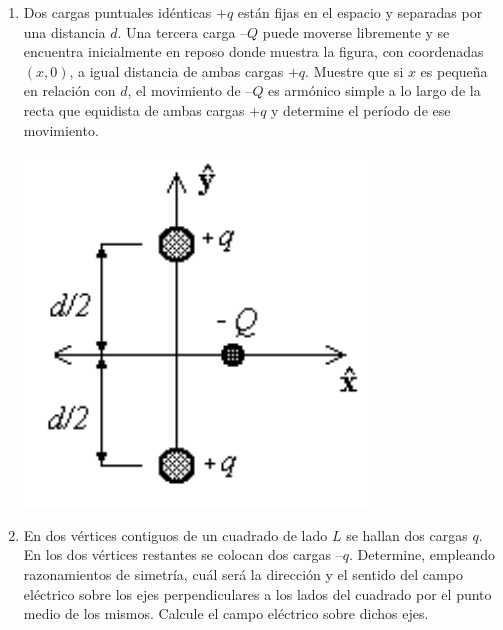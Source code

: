 \documentclass[11pt,spanish,a4paper]{article}
\begin{document}
\begin{enumerate}
	\item \begin{minipage}[t][4.5cm]{0.7\textwidth}
		Dos cargas puntuales idénticas \(+q\) están fijas en el espacio y separadas por una distancia \(d\).
		Una tercera carga \(–Q\) puede moverse libremente y se encuentra inicialmente en reposo donde muestra la figura, con coordenadas \((x,0)\), a igual distancia de ambas cargas \(+q\).
		Muestre que si \(x\) es pequeña en relación con \(d\), el movimiento de \(–Q\) es armónico simple a lo largo de la recta que equidista de ambas cargas \(+q\) y determine el período de ese movimiento.
    \end{minipage}
    \begin{minipage}[c][1em][t]{0.25\textwidth}
		\includegraphics[width=\textwidth]{p1e07}
    \end{minipage}



\item En dos vértices contiguos de un cuadrado de lado \(L\) se hallan dos cargas \(q\).
En los dos vértices restantes se colocan dos cargas \(–q\).
Determine, empleando razonamientos de simetría, cuál será la dirección y el sentido del campo eléctrico sobre los ejes perpendiculares a los lados del cuadrado por el punto medio de los mismos.
Calcule el campo eléctrico sobre dichos ejes.



\end{enumerate}
\end{document}
